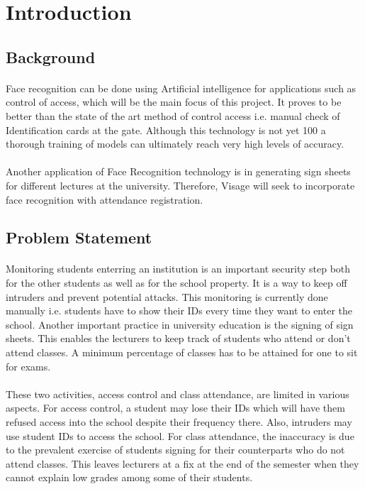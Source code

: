 \section{Introduction}
\label{sec:introduction}
\subsection{Background}
\paragraph{}Face recognition can be done using Artificial intelligence for applications such as control of access, which will be the main focus of this project. It proves to be better than the state of the art method of control access i.e. manual check of Identification cards at the gate. Although this technology is not yet 100 %
a thorough training of models can ultimately reach very high levels of accuracy.
\paragraph{}Another application of Face Recognition technology is in generating sign sheets for different lectures at the university. Therefore, Visage will seek to incorporate face recognition with attendance registration.

\subsection{Problem Statement}
\paragraph{}Monitoring students enterring an institution is an important security step both for the other students as well as for the school property. It is a way to keep off intruders and prevent potential attacks. This monitoring is currently done manually i.e. students have to show their IDs every time they want to enter the school. Another important practice in university education is the signing of sign sheets. This enables the lecturers to keep track of students who attend or don't attend classes. A minimum percentage of classes has to be attained for one to sit for exams.

\paragraph{}These two activities, access control and class attendance, are limited in various aspects. For access control, a student may lose their IDs which will have them refused access into the school despite their frequency there. Also, intruders may use student IDs to access the school. For class attendance, the inaccuracy is due to the prevalent exercise of students signing for their counterparts who do not attend classes. This leaves lecturers at a fix at the end of the semester when they cannot explain low grades among some of their students.


